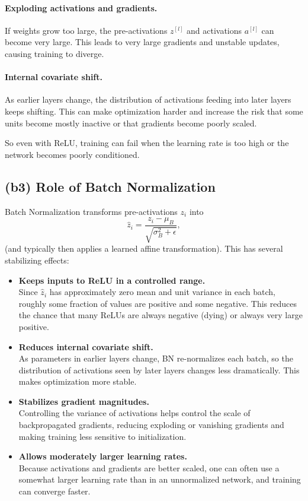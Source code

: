 \documentclass{article}
\begin{document}
\paragraph{Exploding activations and gradients.}
If weights grow too large, the pre-activations $z^{[l]}$ and activations
$a^{[l]}$ can become very large.
This leads to very large gradients and unstable updates, causing
training to diverge.

\paragraph{Internal covariate shift.}
As earlier layers change, the distribution of activations feeding into
later layers keeps shifting. This can make optimization harder and
increase the risk that some units become mostly inactive or that
gradients become poorly scaled.

So even with ReLU, training can fail when the learning rate is too high
or the network becomes poorly conditioned.

\subsection*{(b3) Role of Batch Normalization}

Batch Normalization transforms pre-activations $z_i$ into
\[
\hat z_i = \frac{z_i - \mu_B}{\sqrt{\sigma_B^2 + \epsilon}},
\]
(and typically then applies a learned affine transformation).
This has several stabilizing effects:

\begin{itemize}
	\item \textbf{Keeps inputs to ReLU in a controlled range.} \\
	Since $\hat z_i$ has approximately zero mean and unit variance
	in each batch, roughly some fraction of values are positive and
	some negative. This reduces the chance that many ReLUs are
	always negative (dying) or always very large positive.
	\item \textbf{Reduces internal covariate shift.} \\
	As parameters in earlier layers change, BN re-normalizes each
	batch, so the distribution of activations seen by later layers
	changes less dramatically. This makes optimization more stable.
	\item \textbf{Stabilizes gradient magnitudes.} \\
	Controlling the variance of activations helps control the scale
	of backpropagated gradients, reducing exploding or vanishing
	gradients and making training less sensitive to initialization.
	\item \textbf{Allows moderately larger learning rates.} \\
	Because activations and gradients are better scaled, one can
	often use a somewhat larger learning rate than in an unnormalized
	network, and training can converge faster.
\end{itemize}
\end{document}
